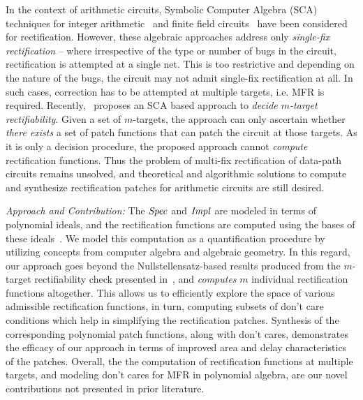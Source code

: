 In the context of arithmetic circuits, Symbolic Computer Algebra (SCA) 
techniques for integer arithmetic~\cite{farimah:2017:1,MF_Rolf:ISVLSI18} and
finite field circuits~\cite{Utkarsh:VLSI18,Vkrao:FMCAD18}
have been considered for rectification. However, these algebraic
approaches address only {\it single-fix rectification} -- where
irrespective of the type or number of bugs in the circuit,
rectification is attempted at a single net. This is too restrictive
and depending on the nature of the bugs, the circuit may not admit
single-fix rectification at all. In such cases, correction has to be
attempted at multiple targets, i.e. MFR is required.
Recently,~\cite{Vkrao:ISQED21} proposes an SCA based approach to 
{\it decide $m$-target rectifiability}. Given a set of $m$-targets,
the approach can only ascertain whether {\it there exists} a set of
patch functions that can patch the circuit at those targets. As 
it is only a decision procedure, the proposed approach cannot 
{\it compute} rectification functions.
Thus the problem of multi-fix rectification of data-path circuits
remains unsolved, and theoretical and algorithmic solutions to compute
and synthesize rectification patches for arithmetic circuits are still
desired. 

{\it Approach and Contribution:}
The ${\it Spec}$ and ${\it Impl}$ are modeled in terms of polynomial ideals, and
the rectification functions are computed using the \Grobner bases of these ideals~\cite{gb_book}.
We model this computation as a quantification procedure by utilizing
concepts from computer algebra and algebraic geometry. 
In this regard, our approach goes beyond
the Nullstellensatz-based results produced from the $m$-target
rectifiability check presented in~\cite{Vkrao:ISQED21}, and {\it computes}
$m$ individual rectification functions altogether. This allows us to
efficiently explore the space of various admissible rectification
functions, in turn, computing subsets of don't care conditions
which help in simplifying the rectification patches. Synthesis of the 
corresponding polynomial patch functions, along with don't cares,  
demonstrates the efficacy of our approach in terms of improved area 
and delay characteristics of the patches.
Overall, the  the computation of rectification functions at multiple
targets, and modeling don't cares for MFR in
polynomial algebra, are our novel contributions not presented
in prior literature. 

